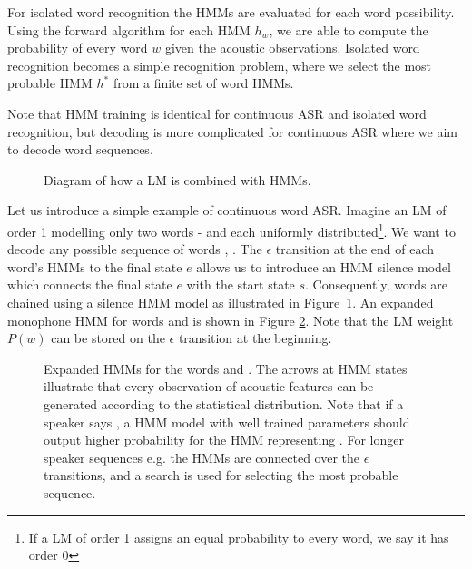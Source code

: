 For isolated word recognition the \acp{HMM} are evaluated for each word possibility. Using the forward algorithm for each \ac{HMM} $h_w$, we are able to compute the probability of every word $w$ given the acoustic observations. Isolated word recognition becomes a simple recognition problem, where we select the most probable \ac{HMM} $h^*$ from a finite set of word \acp{HMM}.

Note that \ac{HMM} training is identical for continuous \ac{ASR} and isolated word recognition, but decoding is more complicated for continuous \ac{ASR} where we aim to decode word sequences.

\begin{figure}[!htp]
  \begin{center}
    
    \caption{Diagram of how a \ac{LM} is combined with \acp{HMM}.}
    \label{fig:hmm_lm} 
  \end{center}
\end{figure}

Let us introduce a simple example of continuous word \ac{ASR}. Imagine an \ac{LM} of order 1 modelling only two words -  and  each uniformly distributed\footnote{If a \ac{LM} of order 1 assigns an equal probability to every word, we say it has order 0}. We want to decode any possible sequence of words , . The $\epsilon$ transition at the end of each word's \acp{HMM} to the final state $e$ allows us to introduce an \ac{HMM} silence model which connects the final state $e$ with the start state $s$. Consequently, words are chained using a silence \ac{HMM} model as illustrated in Figure~\ref{fig:hmm_lm}. An expanded monophone \ac{HMM} for words  and  is shown in Figure \ref{fig:hmm_alt}. Note that the \ac{LM} weight $P(w)$ can be stored on the $\epsilon$ transition at the beginning.

\begin{figure}[!htp]
  \begin{center}
    
    \caption{Expanded \acp{HMM} for the words  and . 
      The arrows at \ac{HMM} states illustrate that every observation of acoustic features 
      can be generated according to the statistical distribution. 
      Note that if a speaker says , a \ac{HMM} model with well trained parameters should output higher probability
      for the \ac{HMM} representing . For longer speaker sequences e.g.  the \acp{HMM} are connected over the $\epsilon$ transitions, and a search is used for selecting the most probable sequence.}
    \label{fig:hmm_alt} 
  \end{center}
\end{figure}

